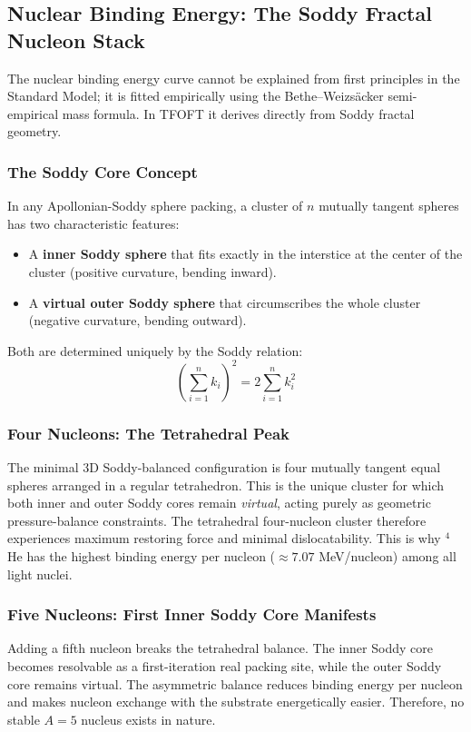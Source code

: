 \documentclass[11pt,a4paper]{article}
\begin{document}
\subsection{Nuclear Binding Energy: The Soddy Fractal Nucleon Stack}

The nuclear binding energy curve cannot be explained from first principles in the
Standard Model; it is fitted empirically using the Bethe--Weizs\"acker
semi-empirical mass formula. In TFOFT it derives directly from Soddy fractal
geometry.

\subsubsection{The Soddy Core Concept}

In any Apollonian-Soddy sphere packing, a cluster of $n$ mutually tangent spheres
has two characteristic features:
\begin{itemize}
  \item A \textbf{inner Soddy sphere} that fits exactly in the interstice at the
        center of the cluster (positive curvature, bending inward).
  \item A \textbf{virtual outer Soddy sphere} that circumscribes the whole cluster
        (negative curvature, bending outward).
\end{itemize}
Both are determined uniquely by the Soddy relation:
\[
  \left(\sum_{i=1}^{n} k_i\right)^2 = 2\sum_{i=1}^{n} k_i^2
\]

\subsubsection{Four Nucleons: The Tetrahedral Peak}

The minimal 3D Soddy-balanced configuration is four mutually tangent equal spheres
arranged in a regular tetrahedron. This is the unique cluster for which both inner
and outer Soddy cores remain \emph{virtual}, acting purely as geometric
pressure-balance constraints. The tetrahedral four-nucleon cluster therefore
experiences maximum restoring force and minimal dislocatability. This is why $^4$He
has the highest binding energy per nucleon ($\approx 7.07$ MeV/nucleon) among all
light nuclei.

\subsubsection{Five Nucleons: First Inner Soddy Core Manifests}

Adding a fifth nucleon breaks the tetrahedral balance. The inner Soddy core becomes
resolvable as a first-iteration real packing site, while the outer Soddy core
remains virtual. The asymmetric balance reduces binding energy per nucleon and makes
nucleon exchange with the substrate energetically easier. Therefore, no stable $A=5$
nucleus exists in nature.
\end{document}
